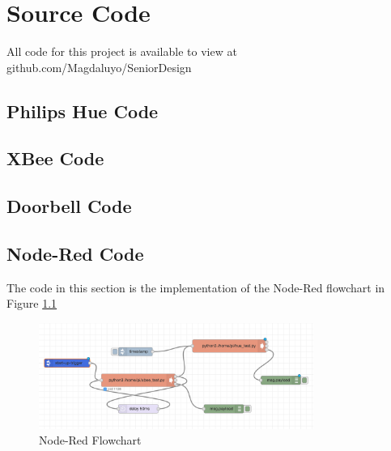 \chapter{Source Code}
All code for this project is available to view at github.com/Magdaluyo/SeniorDesign

\section{Philips Hue Code}


\section{XBee Code}


\section{Doorbell Code}


\section{Node-Red Code}
The code in this section is the implementation of the Node-Red flowchart in Figure \ref{fig:node-red}
\begin{figure}[h]
  \includegraphics[width=0.8\textwidth]{Node-Red-Structure.png}
  \centering
  \caption{Node-Red Flowchart}
  \label{fig:node-red}
\end{figure}

